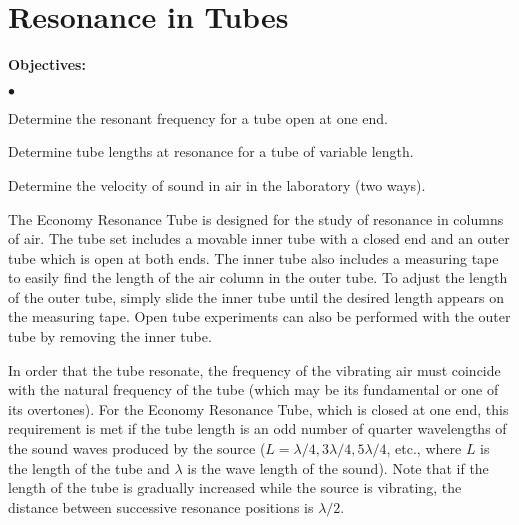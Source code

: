 
\section{Resonance in Tubes}

\makelabheader %



{\noindent \bf Objectives:} \begin{list}{$\bullet$}{\itemsep0pt }

\item Determine the resonant frequency for a tube open at one end.

\item Determine tube lengths at resonance for a tube of variable length.

\item Determine the velocity of sound in air in the laboratory (two ways).

\end{list}


The Economy Resonance Tube is designed for the study of resonance in columns of air.  The tube set includes a movable inner tube with a closed end and an outer tube which is open at both ends.  The inner tube also includes a measuring tape to easily find the length of the air column in the outer tube.  To adjust the length of the outer tube, simply slide the inner tube until the desired length appears on the measuring tape.  Open tube experiments can also be performed with the outer tube by removing the inner tube.

\noindent In order that the tube resonate, the frequency of the vibrating air must coincide with the natural frequency of the tube (which may be its fundamental or one of its overtones). For the Economy Resonance Tube, which is closed at one end, this requirement is met if the tube length is an odd number of quarter wavelengths of the sound waves produced by the source ($L = \lambda/4, 3 \lambda/4, 5 \lambda/4$, etc., where $L$ is the length of the tube and $\lambda$ is the wave length of the sound). Note that if the length of the tube is gradually increased while the source is vibrating, the distance between successive resonance positions is $\lambda/2$. 



